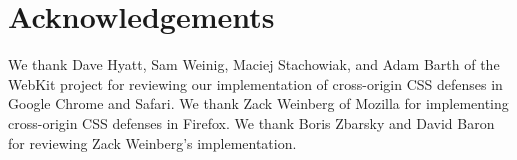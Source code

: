 \documentclass{acm_proc_article-sp}
\begin{document}
\section*{Acknowledgements}

We thank Dave Hyatt, Sam Weinig, Maciej Stachowiak, and Adam Barth of the
WebKit project for reviewing our implementation of cross-origin CSS defenses in Google Chrome and Safari. We thank Zack Weinberg of Mozilla for
implementing cross-origin CSS defenses in Firefox. We thank Boris Zbarsky and David Baron for reviewing Zack Weinberg's implementation.



\end{document}
